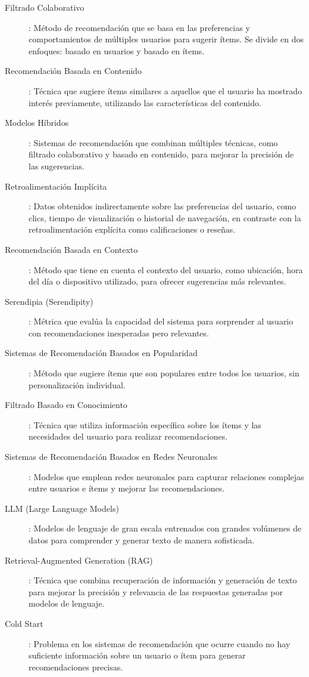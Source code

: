 \documentclass[11pt,a4paper,twoside]{thesis}
\begin{document}
\begin{description}

	\item[Filtrado Colaborativo]: Método de recomendación que se basa en las preferencias y comportamientos de múltiples usuarios para sugerir ítems. Se divide en dos enfoques: basado en usuarios y basado en ítems.
	\item[Recomendación Basada en Contenido]: Técnica que sugiere ítems similares a aquellos que el usuario ha mostrado interés previamente, utilizando las características del contenido.
	\item[Modelos Híbridos]: Sistemas de recomendación que combinan múltiples técnicas, como filtrado colaborativo y basado en contenido, para mejorar la precisión de las sugerencias.
	\item[Retroalimentación Implícita]: Datos obtenidos indirectamente sobre las preferencias del usuario, como clics, tiempo de visualización o historial de navegación, en contraste con la retroalimentación explícita como calificaciones o reseñas.
	\item[Recomendación Basada en Contexto]: Método que tiene en cuenta el contexto del usuario, como ubicación, hora del día o dispositivo utilizado, para ofrecer sugerencias más relevantes.
	\item[Serendipia (Serendipity)]: Métrica que evalúa la capacidad del sistema para sorprender al usuario con recomendaciones inesperadas pero relevantes.
	\item[Sistemas de Recomendación Basados en Popularidad]: Método que sugiere ítems que son populares entre todos los usuarios, sin personalización individual.
	\item[Filtrado Basado en Conocimiento]: Técnica que utiliza información específica sobre los ítems y las necesidades del usuario para realizar recomendaciones.
	\item[Sistemas de Recomendación Basados en Redes Neuronales]: Modelos que emplean redes neuronales para capturar relaciones complejas entre usuarios e ítems y mejorar las recomendaciones.
	\item[LLM (Large Language Models)]: Modelos de lenguaje de gran escala entrenados con grandes volúmenes de datos para comprender y generar texto de manera sofisticada.
	\item[Retrieval-Augmented Generation (RAG)]: Técnica que combina recuperación de información y generación de texto para mejorar la precisión y relevancia de las respuestas generadas por modelos de lenguaje.
	\item[Cold Start]: Problema en los sistemas de recomendación que ocurre cuando no hay suficiente información sobre un usuario o ítem para generar recomendaciones precisas.

\end{description}
\end{document}
